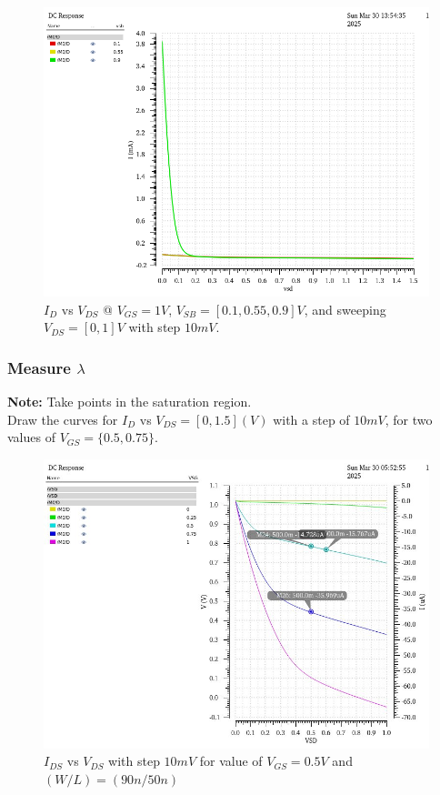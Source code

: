 
\begin{figure}[H]
	\centering
	\includegraphics[width=.6\linewidth]{sections/pic/EX3_PMOS_Id&Vds(Vgs=0_1)(w)(l).png}
	\caption{$I_{D}$ vs $V_{DS}$ @ $V_{GS} = 1V$, $V_{SB} = [0.1, 0.55, 0.9] V$, and sweeping $V_{DS} = [0, 1]V$ with step $10mV$.}
	\label{f_EX3_PMOS_Id&Vds(Vgs=0_1)(w)(l)}
\end{figure}


\subsubsection{Measure $\lambda$}
\textbf{Note:} Take points in the saturation region.\\

Draw the curves for $I_{D}$ vs $V_{DS} = [0, 1.5](V)$ with a step of $10mV$, for two values of $V_{GS} = \{0.5, 0.75\}$.\\


\begin{figure}[H]
	\centering
	\includegraphics[width=0.6\linewidth]{sections/pic/EX3_PMOS_lambda_(w_l)(90_50).png}
	\caption{$I_{DS}$ vs $V_{DS}$ with step $10mV$ for value of $V_{GS} = 0.5V$ and $(W/L) = (90n/50n)$}
	\label{f_EX3_PMOS_lambda_(w_l)(90_50)}
\end{figure}

